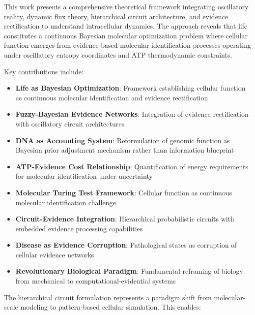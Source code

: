 \documentclass[12pt,a4paper]{article}
\begin{document}
This work presents a comprehensive theoretical framework integrating oscillatory reality, dynamic flux theory, hierarchical circuit architecture, and evidence rectification to understand intracellular dynamics. The approach reveals that life constitutes a continuous Bayesian molecular optimization problem where cellular function emerges from evidence-based molecular identification processes operating under oscillatory entropy coordinates and ATP thermodynamic constraints.

Key contributions include:

\begin{itemize}
\item \textbf{Life as Bayesian Optimization}: Framework establishing cellular function as continuous molecular identification and evidence rectification
\item \textbf{Fuzzy-Bayesian Evidence Networks}: Integration of evidence rectification with oscillatory circuit architectures
\item \textbf{DNA as Accounting System}: Reformulation of genomic function as Bayesian prior adjustment mechanism rather than information blueprint
\item \textbf{ATP-Evidence Cost Relationship}: Quantification of energy requirements for molecular identification under uncertainty
\item \textbf{Molecular Turing Test Framework}: Cellular function as continuous molecular identification challenge
\item \textbf{Circuit-Evidence Integration}: Hierarchical probabilistic circuits with embedded evidence processing capabilities
\item \textbf{Disease as Evidence Corruption}: Pathological states as corruption of cellular evidence networks
\item \textbf{Revolutionary Biological Paradigm}: Fundamental reframing of biology from mechanical to computational-evidential systems
\end{itemize}

The hierarchical circuit formulation represents a paradigm shift from molecular-scale modeling to pattern-based cellular simulation. This enables:
\end{document}
